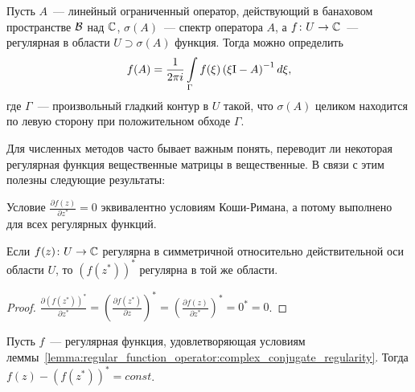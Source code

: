 \begin{definition}
    \label{definition:regular_function_operator:regular_function_operator}
    Пусть $ A $~--- линейный ограниченный оператор, действующий в банаховом пространстве $ \mathcal{B} $ над $ \mathbb{C} $,
    $ \sigma(A) $~--- спектр оператора $ A $, а
    $ f \colon U \to \mathbb{C} $~--- регулярная в области $ U \supset \sigma(A) $ функция.
    Тогда можно определить
    \begin{equation}
        \label{eq:regular_function_operator:regular_function_operator}
        f(A) = \frac{1}{2 \pi i} \int\limits_{\Gamma} f(\xi) \left( \xi \mathrm{I} - A \right)^{-1} d \xi,
    \end{equation}
    где $ \Gamma $~--- произвольный гладкий контур в $ U $ такой,
    что $ \sigma(A) $ целиком находится по левую сторону при положительном обходе $ \Gamma $.
\end{definition}

Для численных методов часто бывает важным понять,
переводит ли некоторая регулярная функция вещественные матрицы в вещественные.
В связи с этим полезны следующие результаты:

\begin{remark}
    \label{remark:regular_function_operator:Wirtinger_derivative}
    Условие $ \frac{\partial f(z)}{\partial z^*} = 0 $ эквивалентно условиям Коши-Римана,
    а потому выполнено для всех регулярных функций.
\end{remark}


\begin{lemma}
    \label{lemma:regular_function_operator:complex_conjugate_regularity}
    Если $ f(z) \colon U \to \mathbb{C} $ регулярна в симметричной относительно действительной оси области $ U $,
    то $ (f(z^*))^* $ регулярна в той же области.
\end{lemma}

\begin{proof}
    $ \frac{\partial (f(z^*))^*}{\partial z^*} = \left( \frac{\partial f(z^*)}{\partial z} \right)^* =
    \left( \frac{\partial f(z)}{\partial z^*} \right)^* = 0^* = 0 $.
\end{proof}


\begin{corollary}
    \label{corollary:regular_function_operator:sum_with_conjugated_is_constant}
    Пусть $ f $~--- регулярная функция, удовлетворяющая условиям
    леммы~\ref{lemma:regular_function_operator:complex_conjugate_regularity}.
    Тогда $ f(z) - (f(z^*))^* = const $.
\end{corollary}

